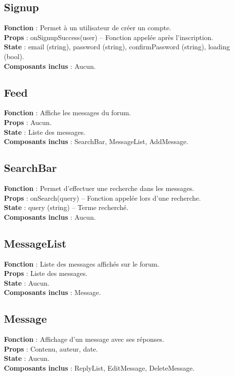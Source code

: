 \documentclass{article}
\begin{document}
\subsection*{Signup}
\textbf{Fonction} : Permet à un utilisateur de créer un compte.\\
\textbf{Props} : onSignupSuccess(user) – Fonction appelée après l'inscription.\\
\textbf{State} : email (string), password (string), confirmPassword (string), loading (bool).\\
\textbf{Composants inclus} : Aucun.

\subsection*{Feed}
\textbf{Fonction} : Affiche les messages du forum.\\
\textbf{Props} : Aucun.\\
\textbf{State} : Liste des messages.\\
\textbf{Composants inclus} : SearchBar, MessageList, AddMessage.

\subsection*{SearchBar}
\textbf{Fonction} : Permet d’effectuer une recherche dans les messages.\\
\textbf{Props} : onSearch(query) – Fonction appelée lors d’une recherche.\\
\textbf{State} : query (string) – Terme recherché.\\
\textbf{Composants inclus} : Aucun.

\subsection*{MessageList}
\textbf{Fonction} : Liste des messages affichés sur le forum.\\
\textbf{Props} : Liste des messages.\\
\textbf{State} : Aucun.\\
\textbf{Composants inclus} : Message.

\subsection*{Message}
\textbf{Fonction} : Affichage d'un message avec ses réponses.\\
\textbf{Props} : Contenu, auteur, date.\\
\textbf{State} : Aucun.\\
\textbf{Composants inclus} : ReplyList, EditMessage, DeleteMessage.
\end{document}
